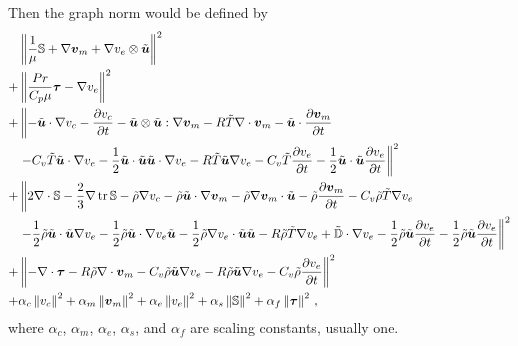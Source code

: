 \documentclass[Dissertation.tex]{subfiles}
\begin{document}
Then the graph norm would be defined by
\begin{equation}
\begin{aligned}
&\left\| \frac{1}{\mu}\mathbb{S}+\nabla\boldsymbol v_m+\nabla v_e\otimes\tilde{\boldsymbol u} \right\|^2\\
+&\left\| \frac{Pr}{C_p\mu}\boldsymbol\tau-\nabla v_e \right\|^2\\
+&\left\|
-\tilde{\boldsymbol u}\cdot\nabla v_c-\frac{\partial v_c}{\partial t}-\tilde{\boldsymbol u}\otimes\tilde{\boldsymbol u}:\nabla\boldsymbol v_m
-R\tilde T\nabla\cdot\boldsymbol v_m-\tilde{\boldsymbol u}\cdot\frac{\partial\boldsymbol v_m}{\partial t}\right.\\
&\left.-C_v\tilde T\tilde{\boldsymbol u}\cdot\nabla v_e-\frac{1}{2}\tilde{\boldsymbol u}\cdot\tilde{\boldsymbol u}\tilde{\boldsymbol u}\cdot\nabla v_e
-R\tilde T\tilde{\boldsymbol u}\nabla v_e
-C_v\tilde T\frac{\partial v_e}{\partial t}-\frac{1}{2}\tilde{\boldsymbol u}\cdot\tilde{\boldsymbol u}\frac{\partial v_e}{\partial t}
\right\|^2\\
+&\left\|2\nabla\cdot\mathbb{S}-\frac{2}{3}\nabla\operatorname*{tr}{\mathbb{S}}
-\tilde\rho\nabla v_c
-\tilde\rho\tilde{\boldsymbol u}\cdot\nabla\boldsymbol v_m-\tilde\rho\nabla\boldsymbol v_m\cdot\tilde{\boldsymbol u}
-\tilde\rho\frac{\partial\boldsymbol v_m}{\partial t}
-C_v\tilde\rho\tilde T\nabla v_e\right.\\
&\left.
-\frac{1}{2}\tilde\rho\tilde{\boldsymbol u}\cdot\tilde{\boldsymbol u}\nabla v_e
-\frac{1}{2}\tilde\rho\tilde{\boldsymbol u}\cdot\nabla v_e\tilde{\boldsymbol u}
-\frac{1}{2}\tilde\rho\nabla v_e\cdot\tilde{\boldsymbol u}\tilde{\boldsymbol u}
-R\tilde\rho\tilde T\nabla v_e
+\tilde{\mathbb{D}}\cdot\nabla v_e
-\frac{1}{2}\tilde\rho\tilde{\boldsymbol u}\frac{\partial v_e}{\partial t}
-\frac{1}{2}\tilde\rho\tilde{\boldsymbol u}\frac{\partial v_e}{\partial t}
\right\|^2\\
+&\left\|-\nabla\cdot\boldsymbol\tau
-R\tilde\rho\nabla\cdot\boldsymbol v_m
-C_v\tilde\rho\tilde{\boldsymbol u}\nabla v_e
-R\tilde\rho\tilde{\boldsymbol u}\nabla v_e
-C_v\tilde\rho\frac{\partial v_e}{\partial t}
\right\|^2\\
+&\alpha_c\left\| v_c \right\|^2
+\alpha_m\left\| \boldsymbol v_m \right\|^2
+\alpha_e\left\| v_e \right\|^2
+\alpha_s\left\| \mathbb{S} \right\|^2
+\alpha_f\left\| \boldsymbol\tau \right\|^2
\,,
\end{aligned}
\end{equation}
where $\alpha_c$, $\alpha_m$, $\alpha_e$, $\alpha_s$, and $\alpha_f$ are scaling constants, usually one.
\end{document}
